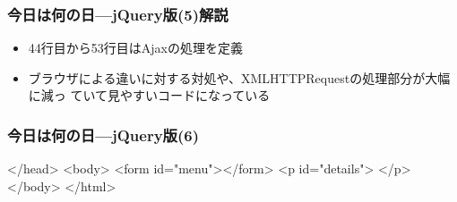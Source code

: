 \documentclass[dvipsk]{beamer}
\begin{document}
\begin{frame}[containsverbatim]
\frametitle{今日は何の日---jQuery版(5)解説}
\begin{itemize}
 \item  44行目から53行目はAjaxの処理を定義
 \item ブラウザによる違いに対する対処や、XMLHTTPRequestの処理部分が大幅に減っ
	       ていて見やすいコードになっている
\end{itemize}
 \end{frame}
\begin{frame}[containsverbatim]
\frametitle{今日は何の日---jQuery版(6)}
 {\scriptsize
 \begin{listingcont}
</head>
<body>
  <form id="menu"></form>
  <p id="details"> </p>
</body>
</html> 
\end{listingcont}
}
\end{frame}
\end{document}
